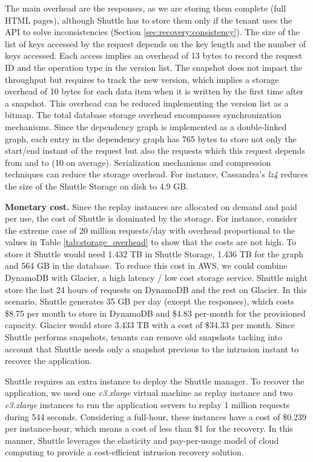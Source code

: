 The main overhead are the responses, as we are storing them complete (full HTML pages), although  Shuttle has to store them only if the tenant uses the API to solve inconsistencies (Section \ref{sec:recovery:consistency}). The size of the list of keys accessed by the request depends on the key length and the number of keys accessed. Each access implies an overhead of 13 bytes to record the request ID and the operation type in the version list. The snapshot does not impact the throughput but requires to track the new version, which implies a storage overhead of 10 bytes for each data item when it is written by the first time after a snapshot. This overhead can be reduced implementing the version list as a bitmap. The total database storage overhead encompasses synchronization mechanisms. Since the dependency graph is implemented as a double-linked graph, each entry in the dependency graph has 765 bytes to store not only the start/end instant of the request but also the requests which this request depends from and to (10 on average). Serialization mechanisms and compression techniques can reduce the storage overhead. For instance, Cassandra's \emph{lz4} reduces the size of the Shuttle Storage on disk to 4.9 GB.


\textbf{Monetary cost.}
%
Since the replay instances are allocated on demand and paid per use, the cost of Shuttle is dominated by the storage. 
For instance, consider the extreme case of 20 million requests/day with overhead proportional to the values in Table \ref{tab:storage_overhead} to show that the costs are not high. To store it Shuttle would need 1.432 TB in Shuttle Storage, 1.436 TB for the graph and 564 GB in the database. 
To reduce this cost in AWS, we could combine DynamoDB with Glacier, a high latency / low cost storage service. Shuttle might store the last 24 hours of requests on DynamoDB and the rest on Glacier. In this scenario, Shuttle generates 35 GB per day (except the responses), which costs \$8.75 per month to store in DynamoDB and \$4.83 per-month for the provisioned capacity. Glacier would store 3.433 TB with a cost of \$34.33 per month. Since Shuttle performs snapshots, tenants can remove old snapshots tacking into account that Shuttle needs only a snapshot previous to the intrusion instant to recover the application.

Shuttle requires an extra instance to deploy the Shuttle manager. To recover the application, we used one \emph{c3.xlarge} virtual machine as replay instance and two  \emph{c3.xlarge} instances to run the application servers to replay 1 million requests during 544 seconds. Considering a full-hour, these instances have a cost of \$0.239 per instance-hour, which means a cost of less than \$1 for the recovery. In this manner, Shuttle leverages the elasticity and pay-per-usage model of cloud computing to provide a cost-efficient intrusion recovery solution.
